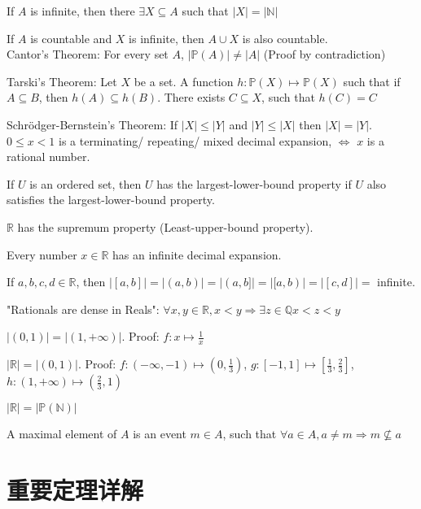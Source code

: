 \documentclass[12pt,a4paper]{ctexrep}
\begin{document}
If $A$ is infinite, then there $\exists X \subseteq A$ such that $|X| = |\mathbb{N}|$

If $A$ is countable and $X$ is infinite, then $A \cup X$ is also countable.\\

Cantor's Theorem:
For every set $A$, $|\mathbb{P}(A)| \neq |A|$ (Proof by contradiction)

Tarski's Theorem:
Let $X$ be a set. A function $h: \mathbb{P}(X)\mapsto \mathbb{P}(X)$ such that if $A \subseteq B$, then $h(A) \subseteq h(B)$. There exists $C \subseteq X$, such that $h(C)=C$

Schr\"odger-Bernstein's Theorem:
If $|X| \leqslant |Y|$ and $|Y| \leqslant |X|$ then $|X| = |Y|$.\\

$0\leqslant x < 1$ is a terminating/ repeating/ mixed decimal expansion, $\iff$ $x$ is a rational number.

If $U$ is an ordered set, then $U$ has the largest-lower-bound property if $U$ also satisfies the largest-lower-bound property.

$\mathbb{R}$ has the supremum property (Least-upper-bound property).

Every number $x\in \mathbb{R}$ has an infinite decimal expansion.

If $a,b,c,d \in \mathbb{R}$, then $|[a,b]| = |(a,b)| = |(a,b]| = |[a,b)| = |[c,d]| = $ infinite.

"Rationals are dense in Reals": $\forall x,y \in \mathbb{R}, x<y \Rightarrow \exists z \in \mathbb{Q} x<z<y$

$|(0,1)| = |(1,+\infty)|$. Proof: $f: x \mapsto \frac{1}{x}$

$|\mathbb{R}| = |(0,1)|$. Proof: $f: (-\infty,-1)\mapsto(0,\frac{1}{3})$, $g: [-1,1]\mapsto[\frac{1}{3},\frac{2}{3}]$, $h: (1,+\infty)\mapsto(\frac{2}{3},1)$

$|\mathbb{R}| = |\mathbb{P}(\mathbb{N})|$

A maximal element of $A$ is an event $m \in A$, such that $\forall a \in A, a \neq m \Rightarrow m \nsubseteq a$

\section{重要定理详解}
\end{document}
